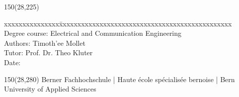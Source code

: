 \begin{titlepage}
\begin{flushleft}
\begin{textblock}{150}(28,225)
\fontsize{10pt}{17pt}\selectfont
\begin{tabbing}
xxxxxxxxxxxxxxx\=xxxxxxxxxxxxxxxxxxxxxxxxxxxxxxxxxxxxxxxxxxxxxxx \kill
Degree course:	\> Electrical and Communication Engineering	\\		%
Authors:		\> Timoth\a'{e}e Mollet		\\					%
Tutor:			\> Prof. Dr. Theo Kluter	\\							%
Date:			\> \versiondate					\\							%
\end{tabbing}

\end{textblock}
\end{flushleft}

\begin{textblock}{150}(28,280)
\noindent 
\color{bfhgrey}\fontsize{9pt}{10pt}\selectfont
Berner Fachhochschule | Haute \'ecole sp\'ecialis\'ee bernoise | Bern University of Applied Sciences
\color{black}\selectfont
\end{textblock}


\end{titlepage}

%
%

